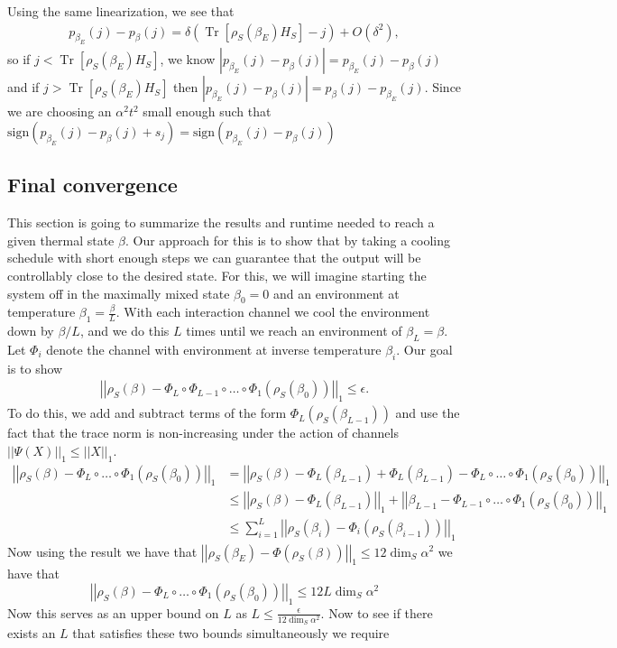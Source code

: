 \documentclass{article}
\newcommand{\brackets}[1]{\left[ #1 \right]}
\newcommand{\norm}[1]{\left| \left| #1 \right| \right|}
\newcommand{\bigo}[1]{O\left( #1 \right)}
\DeclareMathOperator{\Tr}{Tr}
\newcommand{\trace}[1]{\Tr \brackets{ #1 }}
\begin{document}
Using the same linearization, we see that
\begin{align}
    p_{\beta_E}(j) - p_{\beta}(j) = \delta (\trace{\rho_S(\beta_E) H_S} - j) + \bigo{\delta^2},
\end{align}
so if $j < \trace{\rho_S(\beta_E) H_S}$, we know $|p_{\beta_E}(j) - p_{\beta}(j)| = p_{\beta_E}(j) - p_{\beta}(j)$ and if $j > \trace{\rho_S(\beta_E) H_S}$ then $|p_{\beta_E}(j) - p_{\beta}(j)| = p_{\beta}(j) - p_{\beta_E}(j)$. Since we are choosing an $\alpha^2 t^2$ small enough such that $\text{sign} (p_{\beta_E}(j) - p_{\beta}(j) + s_j) = \text{sign} (p_{\beta_E}(j) - p_{\beta}(j))$

\subsection{Final convergence}
This section is going to summarize the results and runtime needed to reach a given thermal state $\beta$. Our approach for this is to show that by taking a cooling schedule with short enough steps we can guarantee that the output will be controllably close to the desired state. For this, we will imagine starting the system off in the maximally mixed state $\beta_0 = 0$ and an environment at temperature $\beta_1 = \frac{\beta}{L}$. With each interaction channel we cool the environment down by $\beta / L$, and we do this $L$ times until we reach an environment of $\beta_L = \beta$. Let $\Phi_i$ denote the channel with environment at inverse temperature $\beta_i$. Our goal is to show
\begin{align}
    \norm{\rho_S(\beta) - \Phi_L \circ \Phi_{L-1} \circ \ldots \circ \Phi_{1} (\rho_S(\beta_0))}_1 \leq \epsilon.
\end{align}
To do this, we add and subtract terms of the form $\Phi_{L}(\rho_S(\beta_{L-1}))$ and use the fact that the trace norm is non-increasing under the action of channels $\norm{\Psi(X)}_1 \leq \norm{X}_1$. 
\begin{align}
    \norm{\rho_S(\beta) - \Phi_L \circ  \ldots \circ \Phi_{1} (\rho_S(\beta_0))}_1 &= \norm{\rho_S(\beta) - \Phi_L(\beta_{L-1}) + \Phi_{L}(\beta_{L - 1}) - \Phi_L \circ  \ldots \circ \Phi_{1} (\rho_S(\beta_0))}_1 \\
    &\leq \norm{\rho_S(\beta) - \Phi_L(\beta_{L-1})}_1 + \norm{\beta_{L-1} - \Phi_{L-1} \circ \ldots \circ \Phi_{1} (\rho_S(\beta_0))}_1 \\
    &\le \sum_{i = 1}^{L} \norm{\rho_S(\beta_i) - \Phi_{i}(\rho_S(\beta_{i - 1}))}_1
\end{align}
Now using the result we have that $\norm{\rho_S(\beta_E) - \Phi(\rho_S(\beta))}_1 \le 12 \dim_S \alpha^2 $ we have that 
$$\norm{\rho_S(\beta) - \Phi_L \circ  \ldots \circ \Phi_{1} (\rho_S(\beta_0))}_1 \le 12 L \dim_S \alpha^2$$
Now this serves as an upper bound on $L$ as $L \le \frac{\epsilon}{12 \dim_S \alpha^2}$. Now to see if there exists an $L$ that satisfies these two bounds simultaneously we require
\end{document}
